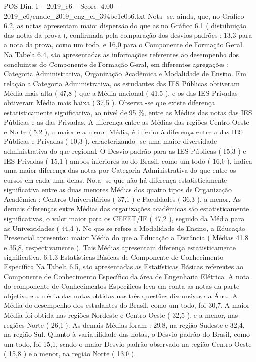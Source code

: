 \begin{textsample}{POS Dim 1 – 2019\_c6 – Score -4.00 – 2019\_c6/enade\_2019\_eng\_el\_394be1c0b6.txt}
Nota -se, ainda, que, no Gráfico 6.2, as notas apresentam maior dispersão do que as no Gráfico 6.1 ( distribuição das notas da prova ), confirmada pela comparação dos desvios padrões : 13,3 para a nota da prova, como um todo, e 16,0 para o Componente de Formação Geral.
Na Tabela 6.4, são apresentadas as informações referentes ao desempenho dos concluintes do Componente de Formação Geral, em diferentes agregações : Categoria Administrativa, Organização Acadêmica e Modalidade de Ensino.
Em relação a Categoria Administrativa, os estudantes das IES Públicas obtiveram Média mais alta ( 47,8 ) que a Média nacional ( 41,5 ), e os das IES Privadas obtiveram Média mais baixa ( 37,5 ).
Observa -se que existe diferença estatisticamente significativa, ao nível de 95 \%, entre as Médias das notas das IES Públicas e as das Privadas.
A diferença entre as Médias das regiões Centro-Oeste e Norte ( 5,2 ), a maior e a menor Média, é inferior à diferença entre a das IES Públicas e Privadas ( 10,3 ), caracterizando -se uma maior diversidade administrativa do que regional.
O Desvio padrão para as IES Públicas ( 15,3 ) e IES Privadas ( 15,1 ) ambos inferiores ao do Brasil, como um todo ( 16,0 ), indica uma maior diferença das notas por Categoria Administrativa do que entre os cursos em cada uma delas.
Nota -se que não há diferença estatisticamente significativa entre as duas menores Médias dos quatro tipos de Organização Acadêmica : Centros Universitários ( 37,1 ) e Faculdades ( 36,3 ), a menor.
As demais diferenças entre Médias das organizações acadêmicas são estatisticamente significativas, o valor maior para os CEFET/IF ( 47,2 ), seguido da Média para as Universidades ( 44,4 ).
No que se refere a Modalidade de Ensino, a Educação Presencial apresentou maior Média do que a Educação a Distância ( Médias 41,8 e 35,8, respectivamente ).
Tais Médias apresentam diferença estatisticamente significativa. 6.1.3 Estatísticas Básicas do Componente de Conhecimento Específico Na Tabela 6.5, são apresentadas as Estatísticas Básicas referentes ao Componente de Conhecimento Específico da área de Engenharia Elétrica.
A nota do componente de Conhecimentos Específicos leva em conta as notas da parte objetiva e a média das notas obtidas nas três questões discursivas da Área.
A Média do desempenho dos estudantes do Brasil, como um todo, foi 30,7.
A maior Média foi obtida nas regiões Nordeste e Centro-Oeste ( 32,5 ), e a menor, nas regiões Norte ( 26,1 ).
As demais Médias foram : 29,8, na região Sudeste e 32,4, na região Sul.
Quanto à variabilidade das notas, o Desvio padrão do Brasil, como um todo, foi 15,1, sendo o maior Desvio padrão observado na região Centro-Oeste ( 15,8 ) e o menor, na região Norte ( 13,0 ).

\end{textsample}
